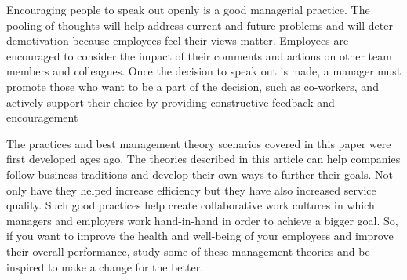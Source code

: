 \documentclass[12pt, french]{article}
\begin{document}
Encouraging people to speak out openly is a good managerial practice. The pooling of thoughts will help address current and future problems and will deter demotivation because employees feel their views matter. Employees are encouraged to consider the impact of their comments and actions on other team members and colleagues. Once the decision to speak out is made, a manager must promote those who want to be a part of the decision, such as co-workers, and actively support their choice by providing constructive feedback and encouragement

The practices and best management theory scenarios covered in this paper were first developed ages ago. The theories described in this article can help companies follow business traditions and develop their own ways to further their goals. Not only have they helped increase efficiency but they have also increased service quality. Such good practices help create collaborative work cultures in which managers and employers work hand-in-hand in order to achieve a bigger goal. So, if you want to improve the health and well-being of your employees and improve their overall performance, study some of these management theories and be inspired to make a change for the better.
\end{document}
